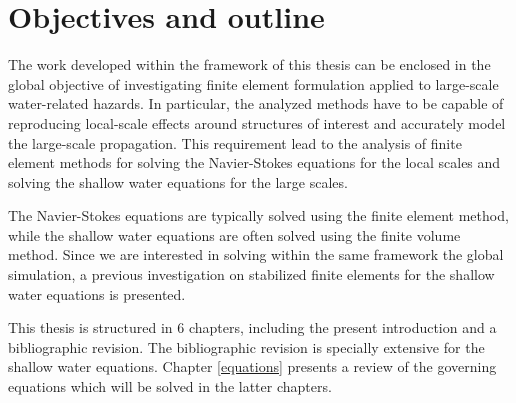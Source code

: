 








\section{Objectives and outline}


The work developed within the framework of this thesis can be enclosed in the global objective of investigating finite element formulation applied to large-scale water-related hazards. In particular, the analyzed methods have to be capable of reproducing local-scale effects around structures of interest and accurately model the large-scale propagation. This requirement lead to the analysis of finite element methods for solving the Navier-Stokes equations for the local scales and solving the shallow water equations for the large scales.

The Navier-Stokes equations are typically solved using the finite element method, while the shallow water equations are often solved using the finite volume method.
Since we are interested in solving within the same framework the global simulation, a previous investigation on stabilized finite elements for the shallow water equations is presented.


This thesis is structured in 6 chapters, including the present introduction and a bibliographic revision. The bibliographic revision is specially extensive for the shallow water equations.
Chapter \ref{equations} presents a review of the governing equations which will be solved in the latter chapters.


